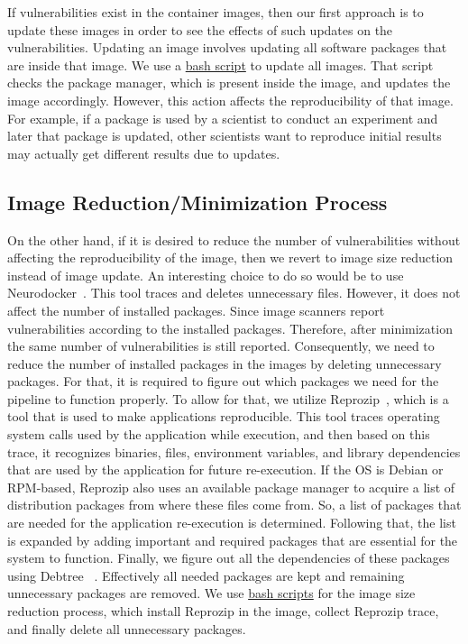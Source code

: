 \documentclass[a4paper,num-refs]{oup-contemporary}
\begin{document}
If vulnerabilities exist in the container images, then our first approach
is to update these images in order to see the effects of such updates
on the vulnerabilities.
Updating an image involves updating all software packages that are
inside that image. We use a 
\href{https://github.com/kaurbhupinder/Vulnerability-Analysis/blob/master/Scripts/update/update.sh}{bash script} 
to update all images. That script checks the
package manager, which is present inside the image, and updates the image
accordingly. However, this action affects the reproducibility
of that image. For example, if a package is used by a scientist to conduct an experiment
and later that package is updated, other scientists want to reproduce initial results may actually
get different results due to updates.

\subsection{Image Reduction/Minimization Process}
On the other hand, if it is desired to reduce the number of vulnerabilities without affecting the reproducibility of the image,
then we revert to image size reduction instead of image update. An interesting choice to do so would be to use 
Neurodocker~\cite{neurodocker}.
This tool traces and deletes unnecessary files.
However, it does not affect the number of installed packages.
Since image scanners report vulnerabilities according to the installed
packages. Therefore, after
minimization the same number of vulnerabilities is still reported.
Consequently, we need to reduce the number of installed packages
in the images by deleting unnecessary packages. For that, it is required to figure
out which packages we need for the pipeline to function properly. To allow for that, we utilize
Reprozip~\cite{rampin2016reprozip}, which is a tool that
is used to make applications reproducible. This tool traces operating system calls used by the
application while execution, and then based on this trace, it recognizes binaries, files, environment variables,
and library dependencies that are used by the application for future re-execution. If the OS is
Debian or RPM-based, Reprozip also
uses an available package manager to acquire a list of distribution packages from where these files come from.
So, a list of packages that are needed for the application re-execution is determined. Following that, the list
is expanded by adding important and required packages that are essential
for the system to function. Finally, we figure out all the dependencies of these packages using Debtree
~\cite{debtree}.
Effectively all needed packages are kept and remaining unnecessary packages are removed. We use
\href{https://github.com/kaurbhupinder/Vulnerability-Analysis/tree/master/Scripts/minification}{bash scripts} for
the image size reduction process, which install Reprozip in the image, collect Reprozip trace, and
finally delete all unnecessary packages.
\end{document}
